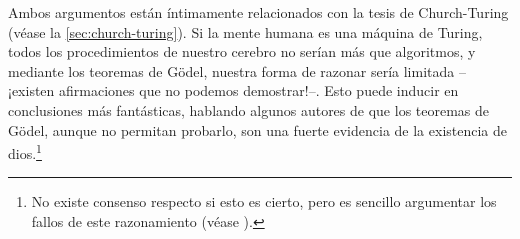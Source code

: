 Ambos argumentos están íntimamente relacionados con la tesis de Church-Turing (véase la \cref{sec:church-turing}). Si la mente humana es una máquina de Turing, todos los procedimientos de nuestro cerebro no serían más que algoritmos, y mediante los teoremas de Gödel, nuestra forma de razonar sería limitada --¡existen afirmaciones que no podemos demostrar!--. Esto puede inducir en conclusiones más fantásticas, hablando algunos autores de que los teoremas de Gödel, aunque no permitan probarlo, son una fuerte evidencia de la existencia de dios.\footnote{No existe consenso respecto si esto es cierto, pero es sencillo argumentar los fallos de este razonamiento (véase \cite{StanfordGodel2022}).} \cite{StanfordGodel2022}

\endinput
